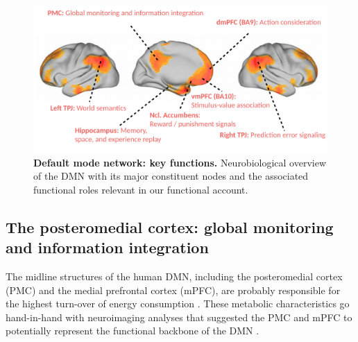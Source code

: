 \documentclass[10pt,letterpaper]{article}
\begin{document}
\begin{figure}[!h]
  \includegraphics[width=.9\linewidth]{neurobiological_overview_DMN.pdf}
  \caption{\textbf{Default mode network: key functions.}
  Neurobiological overview of the DMN with its major constituent nodes and
  the associated functional roles relevant in our functional account.}
  \label{fig:neurobiological_overview_DMN}
\end{figure}
%
\subsection{The posteromedial cortex: global monitoring and information integration}
The midline structures of the human DMN,
including the posteromedial cortex (PMC) and
the medial prefrontal cortex (mPFC),
are probably responsible for the highest turn-over
of energy consumption \citep{raichle2001pnas, raichle_baseline}.
These metabolic characteristics go hand-in-hand with
neuroimaging analyses that suggested the PMC and mPFC to
potentially represent the functional backbone of the DMN
\citep{andrews2010, hagmann2008mapping}.
\end{document}
